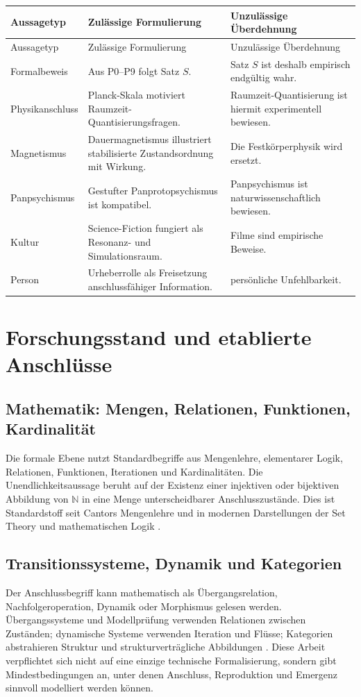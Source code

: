 \documentclass[11pt,a4paper]{article}
\theoremstyle{remark}
\begin{document}
\begin{longtable}{>{\raggedright\arraybackslash}p{}p{}p{}}
\toprule
Aussagetyp & Zulässige Formulierung & Unzulässige Überdehnung \\
\midrule
\endfirsthead
\toprule
Aussagetyp & Zulässige Formulierung & Unzulässige Überdehnung \\
\midrule
\endhead
Formalbeweis & Aus P0--P9 folgt Satz $S$. & Satz $S$ ist deshalb empirisch endgültig wahr. \\
Physikanschluss & Planck-Skala motiviert Raumzeit-Quantisierungsfragen. & Raumzeit-Quantisierung ist hiermit experimentell bewiesen. \\
Magnetismus & Dauermagnetismus illustriert stabilisierte Zustandsordnung mit Wirkung. & Die Festkörperphysik wird ersetzt. \\
Panpsychismus & Gestufter Panprotopsychismus ist kompatibel. & Panpsychismus ist naturwissenschaftlich bewiesen. \\
Kultur & Science-Fiction fungiert als Resonanz- und Simulationsraum. & Filme sind empirische Beweise. \\
Person & Urheberrolle als Freisetzung anschlussfähiger Information. & persönliche Unfehlbarkeit. \\
\bottomrule
\end{longtable}

\section{Forschungsstand und etablierte Anschlüsse}

\subsection{Mathematik: Mengen, Relationen, Funktionen, Kardinalität}
Die formale Ebene nutzt Standardbegriffe aus Mengenlehre, elementarer Logik, Relationen, Funktionen, Iterationen und Kardinalitäten. Die Unendlichkeitsaussage beruht auf der Existenz einer injektiven oder bijektiven Abbildung von $\mathbb{N}$ in eine Menge unterscheidbarer Anschlusszustände. Dies ist Standardstoff seit Cantors Mengenlehre und in modernen Darstellungen der Set Theory und mathematischen Logik \parencite{cantor1895,halmos1960,enderton2001,jech2003}.

\subsection{Transitionssysteme, Dynamik und Kategorien}
Der Anschlussbegriff kann mathematisch als Übergangsrelation, Nachfolgeroperation, Dynamik oder Morphismus gelesen werden. Übergangssysteme und Modellprüfung verwenden Relationen zwischen Zuständen; dynamische Systeme verwenden Iteration und Flüsse; Kategorien abstrahieren Struktur und strukturverträgliche Abbildungen \parencite{maclane1998,baier2008}. Diese Arbeit verpflichtet sich nicht auf eine einzige technische Formalisierung, sondern gibt Mindestbedingungen an, unter denen Anschluss, Reproduktion und Emergenz sinnvoll modelliert werden können.
\end{document}
